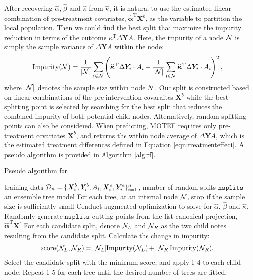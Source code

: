 \documentclass[smallextended]{svjour3}
\newcommand{\trnp}{^\text{T}}
\begin{document}
After recovering $\widehat \alpha$, $\widehat \beta$ and $\widehat \kappa$ from $\widehat{\bm{v}}$, it is natural to use the estimated linear combination of pre-treatment covariates, $\bm{\hat{\alpha}}\trnp \bm X^b$, as the variable to partition the local population. Then we could find the best split that maximize the impurity reduction in terms of the outcome $\kappa\trnp \Delta \bm{Y}A$. Here, the impurity of a node $\cal N$ is simply the sample variance of $\Delta \bm{Y} A$ within the node:
\[
    \text{Impurity}({\cal N})  = \frac{1}{|\cal N|}\sum_{i \in {\cal N}} \left(\bm{\widehat{\kappa}}\trnp \Delta \bm{Y}_i \cdot A_i - \frac{1}{|\cal N|}\sum_{i \in \cal N} \bm{\widehat{\kappa}}\trnp \Delta \bm{Y}_i \cdot A_i\right)^2,
\]
where $|{\cal N}|$ denotes the sample size within node ${\cal N}$. Our split is constructed based on linear combinations of the pre-intervention covaraites $\bm{X}^b$ while the best splitting point is selected by searching for the best split that reduces the combined impurity of both potential child nodes. Alternatively, random splitting points \citep{geurts2006extremely} can also be considered. When predicting, MOTEF requires only pre-treatment covariates $\bm{X}^b$, and returns the within node average of $\Delta \bm{Y} A$, which is the estimated treatment differences defined in Equation \eqref{eqn:treatmenteffect}. A pseudo algorithm is provided in Algorithm \ref{alg:rf}.

\begin{algorithm}
    \caption{Pseudo algorithm for }
    \begin{algorithmic}[1]
        \INPUT training data ${\cal D}_n = \{\bm X^b_i, \bm Y^b_i, A_i, \bm X^e_i, \bm Y^e_i\}_{i=1}^n$, number of random splits $\texttt{nsplits}$
        \OUTPUT an ensemble tree model
        \STATE For each tree, at an internal node ${\cal N}$, stop if the sample size is sufficiently small
        \STATE Conduct augmented optimization to solve for $\widehat \alpha$, $\widehat \beta$ and $\widehat \kappa$.
        \STATE Randomly generate $\texttt{nsplits}$ cutting points from the fist canonical projection, $\bm{\hat{\alpha}}\trnp \bm X^b$ 
        \STATE For each candidate split, denote ${\cal N}_L$ and ${\cal N}_R$ as the two child notes resulting from the candidate split. Calculate the change in impurity:
        \[
        \text{score}( {\cal N}_L, {\cal N}_R) = |{\cal N}_L| \text{Impurity}({\cal N}_L) + |{\cal N}_R|\text{Impurity}({\cal N}_R).
        \]
        \STATE Select the candidate split with the minimum score, and apply 1-4 to each child node.
        \STATE Repeat 1-5 for each tree until the desired number of trees are fitted.
    \end{algorithmic} \label{alg:rf}
\end{algorithm}
\end{document}
